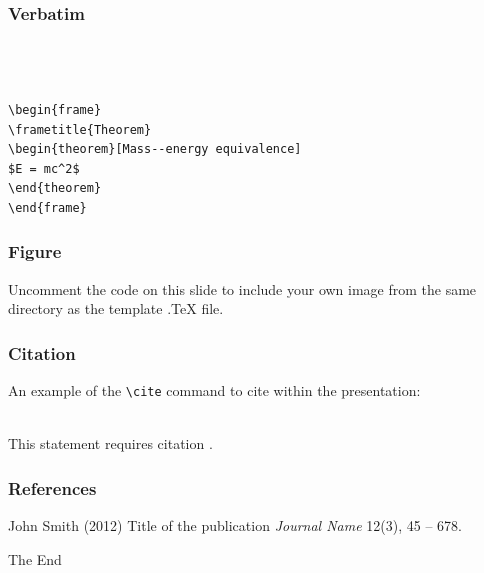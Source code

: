 \documentclass{beamer}
\begin{document}

\begin{frame}[fragile] %
\frametitle{Verbatim}
\begin{example}
\begin{verbatim}



\begin{frame}
\frametitle{Theorem}
\begin{theorem}[Mass--energy equivalence]
$E = mc^2$
\end{theorem}
\end{frame}\end{verbatim}
\end{example}
\end{frame}


\begin{frame}
\frametitle{Figure}
Uncomment the code on this slide to include your own image from the same directory as the template .TeX file.
\end{frame}


\begin{frame}[fragile] %
\frametitle{Citation}
An example of the \verb|\cite| command to cite within the presentation:\\~

This statement requires citation \cite{p1}.
\end{frame}


\begin{frame}
\frametitle{References}
\footnotesize{
\begin{thebibliography}{99} %
 John Smith (2012)
\newblock Title of the publication
\newblock \emph{Journal Name} 12(3), 45 -- 678.
\end{thebibliography}
}
\end{frame}


\begin{frame}
\Huge{\centerline{The End}}
\end{frame}

\end{document}
